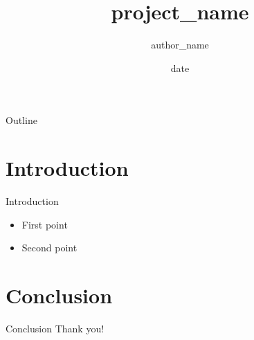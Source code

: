 \documentclass{beamer}
\title{{project_name}}
\author{{author_name}}
\date{{date}}
\begin{document}
\begin{frame}
  \titlepage
\end{frame}

\begin{frame}{Outline}
  \tableofcontents
\end{frame}

\section{Introduction}

\begin{frame}{Introduction}
  \begin{itemize}
    \item First point
    \item Second point
  \end{itemize}
\end{frame}

\section{Conclusion}

\begin{frame}{Conclusion}
  Thank you!
\end{frame}
\end{document}
